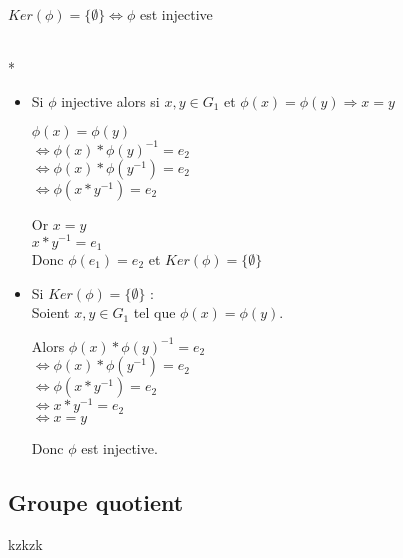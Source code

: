 \documentclass[12pt]{report}
\theoremstyle{break}%
\newenvironment{myproof}[1][\proofname]{\proof[#1]\mbox{}\\*}{\endproof}
\begin{document}
\begin{maprop}
	$Ker(\phi)=\{\emptyset\} \Leftrightarrow \phi $ est injective 
\end{maprop}
\begin{myproof}[D\'emonstration :] 
	\begin{itemize}\renewcommand{\labelitemi}{$\bullet$}
		\item Si $\phi$ injective alors si $ x, y \in G_1$ et $\phi(x) = \phi(y) \Rightarrow x=y $
		\begin{tabbing}
	 	\hspace{0.5cm}$\phi(x) = \phi(y)$ \\ 
	 	$ \Leftrightarrow \phi(x) * \phi(y)^{-1} = e_2 $ \\
		$\Leftrightarrow \phi(x) * \phi(y^{-1}) = e_2 $ \\
	 	$\Leftrightarrow \phi(x*y^{-1})=e_2  $ \\ 
		\end{tabbing}
		Or $x=y $\\
		\hspace{0.4cm} $x*y^{-1}=e_1$\\
		Donc $\phi(e_1) = e_2 $ et $Ker(\phi) = \{\emptyset\}$ \\
	
		\item Si $Ker(\phi)=\{\emptyset\}$ :\\
		 Soient $x, y \in G_1 $ tel que $\phi(x)=\phi(y)$.
		 \begin{tabbing}
	 	Alors
	 	$\phi(x) * \phi(y)^{-1} = e_2 $ \\ 
	 	\hspace{0.4cm} $ \Leftrightarrow \phi(x) * \phi(y^{-1}) = e_2 $ \\
		\hspace{0.4cm} $\Leftrightarrow \phi(x*y^{-1}) = e_2 $ \\
	 	\hspace{0.4cm} $\Leftrightarrow x*y^{-1}=e_2  $ \\ 
	 	\hspace{0.4cm} $\Leftrightarrow x = y  $
		\end{tabbing}
		Donc $\phi$ est injective.
	\end{itemize}
\end{myproof}

\subsection{Groupe quotient}

\newpage
kzkzk
\end{document}
